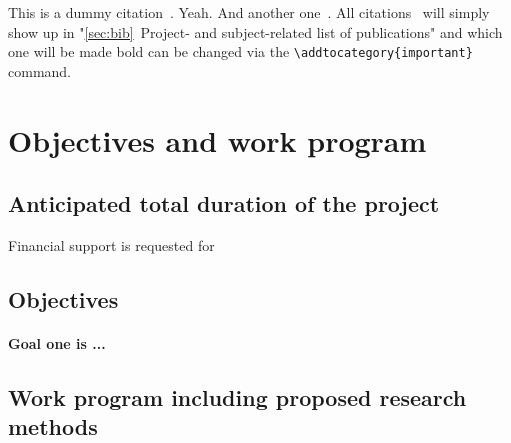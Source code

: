 \documentclass{scrartcl}
\begin{document}
This is a dummy citation~\cite{lamkiewicz2024ribap}. Yeah. And another one~\cite{assmann2025augmentation}. All citations~\cite{fuchs2025varvamp,galeone2025decoding,raharinirina2025sars} will simply show up in "\ref{sec:bib}~Project- and subject-related list of publications" and which one will be made bold can be changed via the \verb=\addtocategory{important}= command.

\lipsum[1]

\section{Objectives and work program}

\subsection{Anticipated total duration of the project}
Financial support is requested for 

\subsection{Objectives}
\let\oldpara=\theparagraph
\addtocounter{secnumdepth}{1}
\renewcommand{\theparagraph}{Goal \arabic{paragraph}}

\paragraph{\textnormal{Goal one is ...}}

\subsection{Work program including proposed research methods}

\addtocounter{secnumdepth}{1}
\renewcommand{\theparagraph}{WP\arabic{paragraph}}
\end{document}
